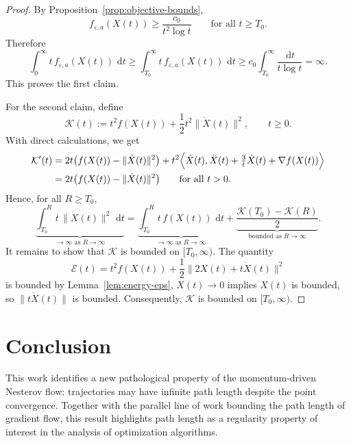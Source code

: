 \documentclass{article}
\theoremstyle{remark}
\newcommand{\norm}[1]{\| #1\|}
\newcommand{\ip}[2]{\langle #1,#2\rangle}
\newcommand{\dd}{\,\mathrm{d}}
\begin{document}
\begin{proof}
By Proposition~\ref{prop:objective-bounds},
\[
  f_{\varepsilon,a}(X(t))\ge \frac{c_0}{t^2\log t}
  \qquad\text{for all }t\ge T_0.
\]
Therefore
\[
  \int_0^\infty t\,f_{\varepsilon,a}(X(t))\,\dd t
  \ge
  \int_{T_0}^\infty t\,f_{\varepsilon,a}(X(t))\,\dd t
  \ge
  c_0\int_{T_0}^\infty \frac{\dd t}{t\log t}
  =\infty.
\]
This proves the first claim.

For the second claim, define
\[
  \mathcal{K}(t):=t^2 f(X(t))+\frac12 t^2\norm{\dot X(t)}^2,
  \qquad t\ge 0.
\]
With direct calculations, we get
\begin{align*}
  \mathcal{K}'(t)
  &=2t\big(f(X(t))-\norm{\dot X(t)}^2\big)
    +t^2\Bigl\langle \dot X(t),\ddot X(t)+\tfrac3t\dot X(t)+\nabla f(X(t))\Bigr\rangle \\
  &=2t\big(f(X(t))-\norm{\dot X(t)}^2\big)
  \qquad\text{for all }t>0.
\end{align*}
Hence, for all $R\ge T_0$,
\[
  \underbrace{
  \int_{T_0}^R t\,\norm{\dot X(t)}^2\,\dd t}_{\rightarrow\infty \text{ as } R\rightarrow\infty}
  =
  \underbrace{
  \int_{T_0}^R t\,f(X(t))\,\dd t}_{\rightarrow \infty\text{ as } R\rightarrow\infty}
  +\underbrace{\frac{\mathcal{K}(T_0)-\mathcal{K}(R)}{2}}_{\text{bounded as } R\rightarrow\infty}.
\]
It remains to show that $\mathcal{K}$ is bounded on $[T_0,\infty)$. The quantity
\[
  \mathcal{E}(t)=t^2 f(X(t))+\frac12 \norm{2X(t)+t\dot X(t)}^2
\] 
is bounded by Lemma~\ref{lem:energy-eps}, $X(t)\rightarrow 0$ implies $X(t)$ is bounded, so
$\norm{t\dot X(t)}$ is bounded. Consequently, $\mathcal{K}$ is bounded on $[T_0,\infty)$.
\end{proof}



\section{Conclusion}
This work identifies a new pathological property of the momentum-driven Nesterov flow: trajectories may have infinite path length despite the point convergence. Together with the parallel line of work bounding the path length of gradient flow, this result highlights path length as a regularity property of interest in the analysis of optimization algorithms.
\end{document}
